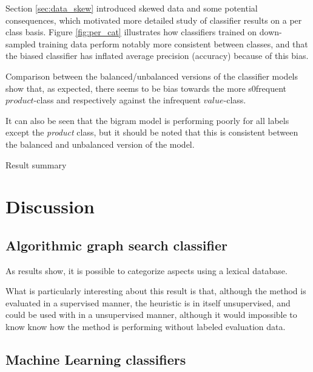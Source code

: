 \documentclass[a4paper,11pt]{kth-mag}
\begin{document}
Section \ref{sec:data_skew} introduced skewed data and some potential consequences, which motivated more detailed study of classifier results on a per class basis. Figure \ref{fig:per_cat} illustrates how classifiers trained on
down-sampled training data perform notably more consistent between classes, and that the biased classifier has inflated average precision (accuracy) because of this bias.

Comparison between the balanced/unbalanced versions of the classifier models show that, as expected, there seems to be bias towards the more s0frequent $product$-class and respectively against the infrequent $value$-class.

It can also be seen that the bigram model is performing poorly for all labels except the \emph{product} class, but it should be noted that this is consistent between the balanced and unbalanced version of the model.


\begin{table}[h]
  \centering

  \vspace{0.4cm}\caption{Result summary}
  \label{general_asp}
\end{table}

\section{Discussion}
\subsection{Algorithmic graph search classifier}
As results show, it is possible to categorize aspects using a lexical database.

What is particularly interesting about this result is that, although the method is evaluated in a supervised
manner, the heuristic is in itself unsupervised, and could be used with in a unsupervised manner, although it would impossible to know know how the method is performing without labeled evaluation data.

\subsection{Machine Learning classifiers}
\end{document}
